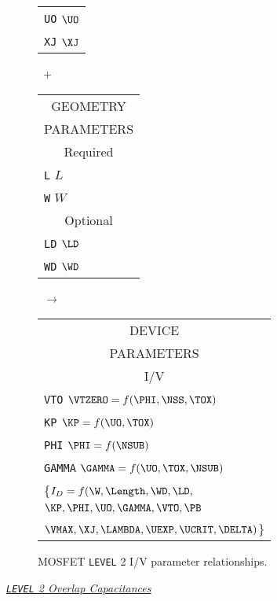 {{\begin{figure}[hb]
\begin{tabular}[t]{|p{1in}|}
{\tt UO} \hfill $\UO$\\
{\tt XJ} \hfill $\XJ$\\
\hline
\end{tabular}
\hfill
\parbox{0.1in}{\ \vspace*{0.2in}\newline +}
\hfill
\begin{tabular}[t]{|p{1in}|}
\hline
\multicolumn{1}{|c|}{GEOMETRY} \\
\multicolumn{1}{|c|}{PARAMETERS} \\
\hline \hline
\multicolumn{1}{|c|}{Required} \\
\hline
{\tt L} \hfill $L$\\
{\tt W} \hfill $W$ \\
\hline \hline
\multicolumn{1}{|c|}{Optional} \\
\hline
{\tt LD} \hfill $\LD$\\
{\tt WD} \hfill $\WD$ \\
\hline
\end{tabular}
\hfill
\parbox{0.1in}{\ \vspace*{0.2in}\newline $\rightarrow$}
\hfill
\begin{tabular}[t]{|p{1.8in}|}
\hline
\multicolumn{1}{|c|}{DEVICE} \\
\multicolumn{1}{|c|}{PARAMETERS} \\
\hline \hline
\multicolumn{1}{|c|}{I/V}\\
\hline
{\tt VTO} \hfill $\VTZERO = f(\PHI, \NSS, \TOX)$\\
{\tt KP} \hfill $\KP = f(\UO, \TOX)$\\
{\tt PHI} \hfill $\PHI = f(\NSUB)$\\
{\tt GAMMA} \hfill $\GAMMA = f(\UO, \TOX, \NSUB)$\\
\hspace*{\fill}\{$I_{D} = f(\W, \Length, \WD, \LD,$\\
\hspace*{\fill}$\KP, \PHI, \UO, \GAMMA, \VTO, \PB$\\
\hspace*{\fill}$\VMAX, \XJ, \LAMBDA, \UEXP, \UCRIT, \DELTA)$\}\\
\hline
\end{tabular}
\caption{ MOSFET {\tt LEVEL} 2 I/V parameter relationships.
\label{mlevel2iv}}
\end{figure}}
\vshift
\noindent\underline{\sl \large {\tt LEVEL} 2 Overlap Capacitances}\\[0.1in]
 }
